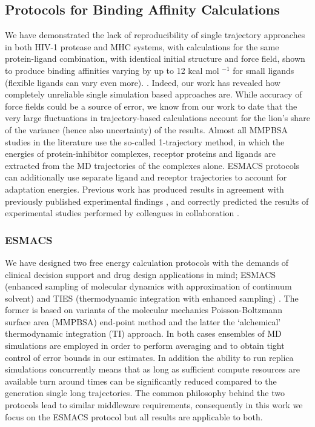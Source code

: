 
\subsection{Protocols for Binding Affinity Calculations}

We have demonstrated the lack of reproducibility of single trajectory
approaches in both HIV-1 protease and MHC systems, with calculations for the
same protein-ligand combination, with identical initial structure and force
field, shown to produce binding affinities varying by up to 12 kcal mol
$^{-1}$ for small ligands (flexible ligands can vary even more).
\cite{Wan2015, Sadiq2010, Wright2014}. Indeed, our work has revealed how
completely unreliable single simulation based approaches are. While accuracy
of force fields could be a source of error, we know from our work to date
\cite{} that the very large fluctuations in trajectory-based calculations
account for the lion’s share of the variance (hence also uncertainty) of the
results. Almost all MMPBSA studies in the literature use the so-called
1-trajectory method, in which the energies of protein-inhibitor complexes,
receptor proteins and ligands are extracted from the MD trajectories of the
complexes alone. ESMACS protocols can additionally use separate ligand and
receptor trajectories to account for adaptation energies. Previous work has
produced results in agreement with previously published experimental findings
\cite{Sadiq2010, Wan2011, Wright2014, Bhati2017, Wan2017brd4, Wan2017trk}, and
correctly predicted the results of experimental studies performed by
colleagues in collaboration \cite{Bunney2015}.


\subsubsection*{ESMACS}

We have designed two free energy calculation protocols with the demands of clinical 
decision support and drug design applications in mind; ESMACS (enhanced sampling
of molecular dynamics with approximation of continuum
solvent)\cite{Wan2017brd4} and TIES (thermodynamic integration with enhanced
sampling) \cite{Bhati2017}. The former is based on variants of the molecular
mechanics Poisson-Boltzmann surface area (MMPBSA) end-point method and the
latter the `alchemical' thermodynamic integration (TI) approach. In both cases
ensembles of MD simulations are employed in order to perform averaging and to
obtain tight control of error bounds in our estimates.
In addition the ability to run replica simulations concurrently means that as long 
as sufficient compute resources are available turn around times can be significantly 
reduced compared to the generation single long trajectories.
The common philosophy behind the two protocols lead to similar middleware requirements, 
consequently in this work we focus on the ESMACS protocol but all results are applicable 
to both.

